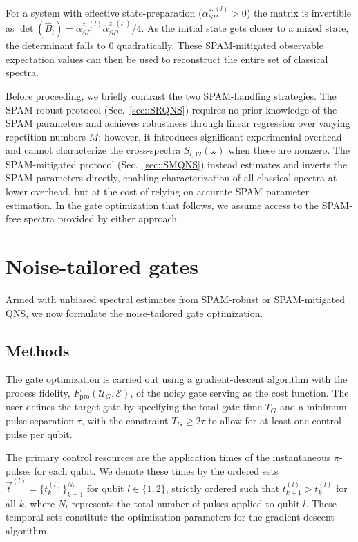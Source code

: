 \documentclass[%
 reprint,
superscriptaddress,
 amsmath,amssymb,
 aps,
pra,
]{revtex4-2}
\newcommand{\qk}[1]{{\color{OliveGreen}#1}}
\begin{document}
For a system with effective state-preparation ($\alpha_{SP}^{z,(l)}>0$) the matrix is invertible as $\det(\hat{B}_l)=\hat{\alpha}_{SP}^{z,(l)}\hat{\alpha}_{SP}^{z,(l')}/4$. As the initial state gets closer to a mixed state, the determinant falls to 0 quadratically. These SPAM-mitigated observable expectation values can then be used to reconstruct the entire set of classical spectra.

\qk{Before proceeding, we briefly contrast the two SPAM-handling strategies. The SPAM-robust protocol (Sec.~\ref{sec::SRQNS}) requires no prior knowledge of the SPAM parameters and achieves robustness through linear regression over varying repetition numbers $M$; however, it introduces significant experimental overhead and cannot characterize the cross-spectra $S_{l,12}(\omega)$ when these are nonzero. The SPAM-mitigated protocol (Sec.~\ref{sec::SMQNS}) instead estimates and inverts the SPAM parameters directly, enabling characterization of all classical spectra at lower overhead, but at the cost of relying on accurate SPAM parameter estimation. In the gate optimization that follows, we assume access to the SPAM-free spectra provided by either approach.}

\section{Noise-tailored gates}
\label{sec::optGates}

\qk{Armed with unbiased spectral estimates from SPAM-robust or SPAM-mitigated QNS, we now formulate the noise-tailored gate optimization.}

\subsection{Methods}
The gate optimization is carried out using a gradient-descent algorithm with the process fidelity, $F_{\text{pro}}(\mathcal{U}_G, \mathcal{E})$, of the noisy gate serving as the cost function. The user defines the target gate by specifying the total gate time $T_G$ and a minimum pulse separation $\tau$, with the constraint $T_G \geq 2\tau$ to allow for at least one control pulse per qubit. 

The primary control resources are the application times of the instantaneous $\pi$-pulses for each qubit. We denote these times by the ordered sets $\vec{t}^{(l)} = \{t_k^{(l)}\}_{k=1}^{N_l}$ for qubit $l \in \{1, 2\}$, strictly ordered such that $t_{k+1}^{(l)} > t_k^{(l)}$ for all $k$, where $N_l$ represents the total number of pulses applied to qubit $l$. These temporal sets constitute the optimization parameters for the gradient-descent algorithm.
\end{document}
